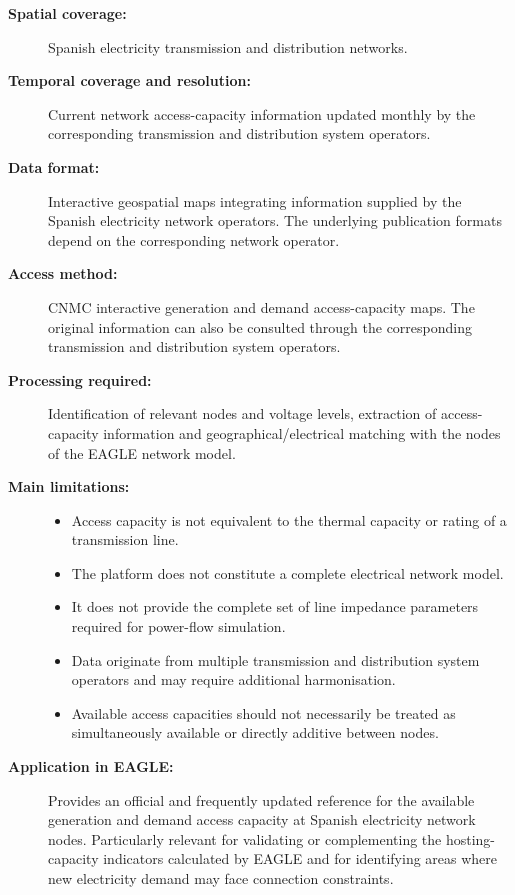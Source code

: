 \begin{description}
    \item[\textbf{Spatial coverage:}]
    Spanish electricity transmission and distribution networks.

    \item[\textbf{Temporal coverage and resolution:}]
    Current network access-capacity information updated monthly by the
    corresponding transmission and distribution system operators.

    \item[\textbf{Data format:}]
    Interactive geospatial maps integrating information supplied by the
    Spanish electricity network operators. The underlying publication
    formats depend on the corresponding network operator.

    \item[\textbf{Access method:}]
    CNMC interactive generation and demand access-capacity maps. The
    original information can also be consulted through the corresponding
    transmission and distribution system operators.

    \item[\textbf{Processing required:}]
    Identification of relevant nodes and voltage levels, extraction of
    access-capacity information and geographical/electrical matching with
    the nodes of the EAGLE network model.

    \item[\textbf{Main limitations:}] \hfill
    \begin{itemize}
        \item Access capacity is not equivalent to the thermal capacity
        or rating of a transmission line.
        \item The platform does not constitute a complete electrical
        network model.
        \item It does not provide the complete set of line impedance
        parameters required for power-flow simulation.
        \item Data originate from multiple transmission and distribution
        system operators and may require additional harmonisation.
        \item Available access capacities should not necessarily be treated
        as simultaneously available or directly additive between nodes.
    \end{itemize}

    \item[\textbf{Application in EAGLE:}]
    Provides an official and frequently updated reference for the available
    generation and demand access capacity at Spanish electricity network
    nodes. Particularly relevant for validating or complementing the
    hosting-capacity indicators calculated by EAGLE and for identifying
    areas where new electricity demand may face connection constraints.

\end{description}

